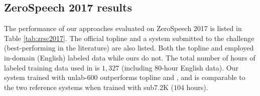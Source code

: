 \documentclass[a4paper]{article}
\begin{document}
\subsection{ZeroSpeech 2017 results}
\begin{table}[!t]
\renewcommand\arraystretch{0.80}
\centering
\caption{ABX error rate of  BNFs  on ZeroSpeech 2017 English sets. Models are trained with  Libri-light using Dutch labels.}
\label{tab:zrsc2017}
\end{table}
The performance of our approaches evaluated on ZeroSpeech 2017 is listed in Table \ref{tab:zrsc2017}. The official topline \cite{dunbar2017zero}  and a system submitted to the challenge (best-performing in the literature) \cite{shibata2017composite} are also listed. Both the topline and \cite{shibata2017composite}  employed in-domain (English) labeled data while ours do not. The total number of hours of labeled training data used in \cite{shibata2017composite} is $1,327$ (including $80$-hour English data).
Our system trained with unlab-600 outperforms topline and \cite{shibata2017composite}, and is comparable to the two reference systems when trained with sub7.2K ($104$ hours).
\end{document}
